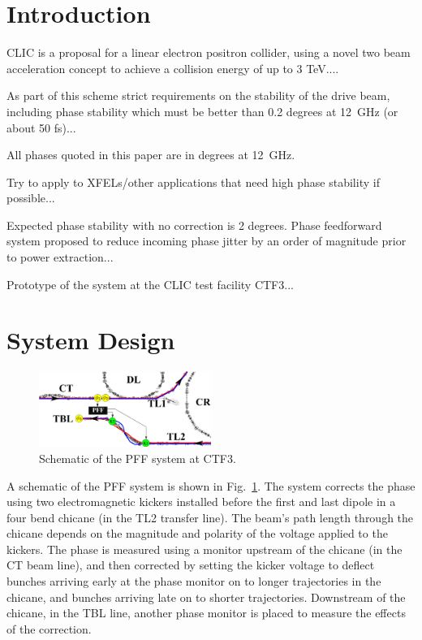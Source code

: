 \documentclass[%
 reprint,
 amsmath,amssymb,
 aps,
]{revtex4-1}
\begin{document}

\section{\label{s:intro}Introduction}

CLIC is a proposal for a linear electron positron collider, using a novel two 
beam acceleration concept to achieve a collision energy of up to 3 TeV....

As part of this scheme strict requirements on the stability of the drive beam, including phase stability which must be better than 0.2 degrees at 12~GHz (or about 50 fs)...

All phases quoted in this paper are in degrees at 12~GHz.

Try to apply to XFELs/other applications that need high phase stability if possible...

Expected phase stability with no correction is 2 degrees. Phase feedforward system proposed to reduce incoming phase jitter by an order of magnitude prior to power extraction...

Prototype of the system at the CLIC test facility CTF3...

\section{\label{s:ctfLayout}System Design}

\begin{figure}
	\includegraphics[width=0.5\textwidth]{figs/ctfpffLayout}%
	\caption{\label{fig:pffLayout}Schematic of the PFF system at CTF3.}
\end{figure}

A schematic of the PFF system is shown in Fig.~\ref{fig:pffLayout}. The system 
corrects the phase using two electromagnetic kickers installed 
before the first and last dipole in a four bend chicane (in the TL2 transfer 
line). The beam's path length 
through the chicane depends on the magnitude and polarity of the voltage 
applied to the kickers. The phase is measured using a monitor upstream of 
the chicane (in the CT beam line), and then corrected by setting the kicker 
voltage to deflect bunches arriving early at the phase monitor on to longer 
trajectories in the chicane, and bunches arriving late on to shorter 
trajectories. Downstream of the chicane, in the TBL line, another phase monitor 
is placed to measure the effects of the correction.
\end{document}

